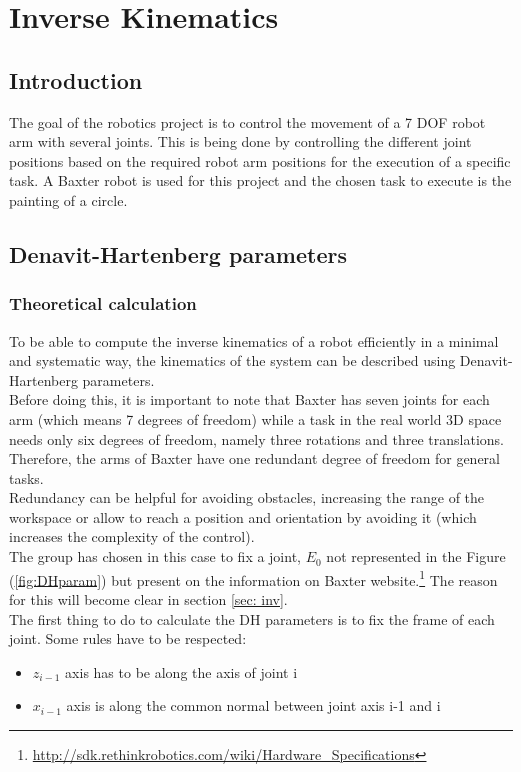 \chapter{Inverse Kinematics}
\label{chap:inv kin}


\section{Introduction}

The goal of the robotics project is to control the movement of a 7 DOF robot arm with several joints. This is being done by controlling the different joint positions based on the required robot arm positions for the execution of a specific task. A Baxter robot is used for this project and the chosen task to execute is the painting of a circle. 


\section{Denavit-Hartenberg parameters}
\subsection{Theoretical calculation}
To be able to compute the inverse kinematics of a robot efficiently in a minimal and systematic way, the kinematics of the system can be described using Denavit-Hartenberg parameters. \\
Before doing this, it is important to note that Baxter has seven joints for each arm (which means 7 degrees of freedom) while a task in the real world 3D space needs only six degrees of freedom, namely three rotations and three translations. Therefore, the arms of Baxter have one redundant degree of freedom for general tasks.\\
Redundancy can be helpful for avoiding obstacles, increasing the range of the workspace or allow to reach a position and orientation by avoiding it (which increases the complexity of the control).\\
The group has chosen in this case to fix a joint, $E_0$ not represented in the Figure (\ref{fig:DHparam}) but present on the information on Baxter website.\footnote{\url{http://sdk.rethinkrobotics.com/wiki/Hardware\_Specifications}} The reason for this will become clear in section \ref{sec: inv}.\\

\noindent The first thing to do to calculate the DH parameters is to fix the frame of each joint. Some rules have to be respected: \\
\begin{itemize}
\item $z_{i-1}$ axis has to be along the axis of joint i
\item $x_{i-1}$ axis is along the common normal between joint axis i-1 and i
\end{itemize}

